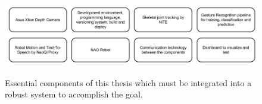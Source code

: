 \begin{figure}
	[h] \centering 
	\includegraphics[height=35mm]{figures/content/hri-components.jpg} \caption{Essential components of this thesis which must be integrated into a robust system to accomplish the goal.} \label{fg:hri:components} 
\end{figure}
